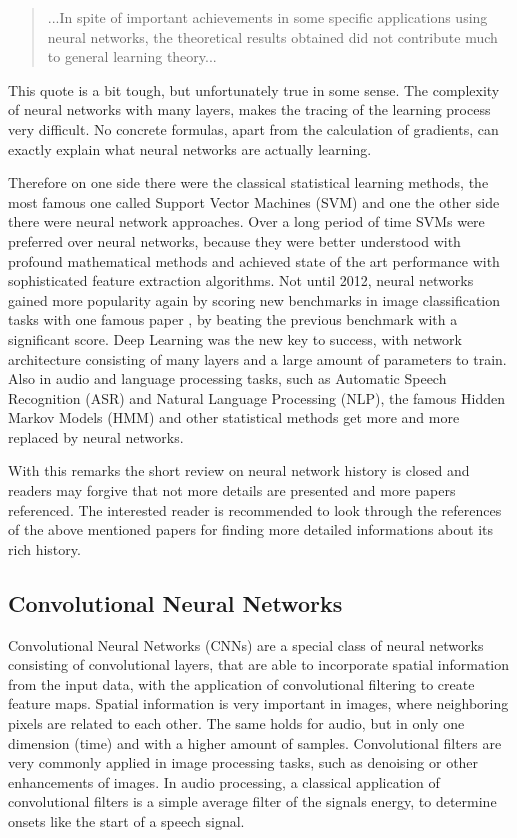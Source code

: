 \begin{quote}
...In spite of important achievements in some specific applications using neural networks, the theoretical results obtained did not contribute much to general learning theory...
\end{quote}

This quote is a bit tough, but unfortunately true in some sense. 
The complexity of neural networks with many layers, makes the tracing of the learning process very difficult.
No concrete formulas, apart from the calculation of gradients, can exactly explain what neural networks are actually learning.

Therefore on one side there were the classical statistical learning methods, the most famous one called Support Vector Machines (SVM) \cite{Cortes1995} and one the other side there were neural network approaches.
Over a long period of time SVMs were preferred over neural networks, because they were better understood with profound mathematical methods and achieved state of the art performance with sophisticated feature extraction algorithms.
Not until 2012, neural networks gained more popularity again by scoring new benchmarks in image classification tasks with one famous paper \cite{Krizhevsky2012}, by beating the previous benchmark with a significant score.
Deep Learning was the new key to success, with network architecture consisting of many layers and a large amount of parameters to train.
Also in audio and language processing tasks, such as Automatic Speech Recognition (ASR) and Natural Language Processing (NLP), the famous Hidden Markov Models (HMM) and other statistical methods get more and more replaced by neural networks.

With this remarks the short review on neural network history is closed and readers may forgive that not more details are presented and more papers referenced.
The interested reader is recommended to look through the references of the above mentioned papers for finding more detailed informations about its rich history.



\subsection{Convolutional Neural Networks}\label{sec:prev_nn_cnn}
Convolutional Neural Networks (CNNs) are a special class of neural networks consisting of convolutional layers, that are able to incorporate spatial information from the input data, with the application of convolutional filtering to create feature maps.
Spatial information is very important in images, where neighboring pixels are related to each other.
The same holds for audio, but in only one dimension (time) and with a higher amount of samples.
Convolutional filters are very commonly applied in image processing tasks, such as denoising or other enhancements of images.
In audio processing, a classical application of convolutional filters is a simple average filter of the signals energy, to determine onsets like the start of a speech signal.

